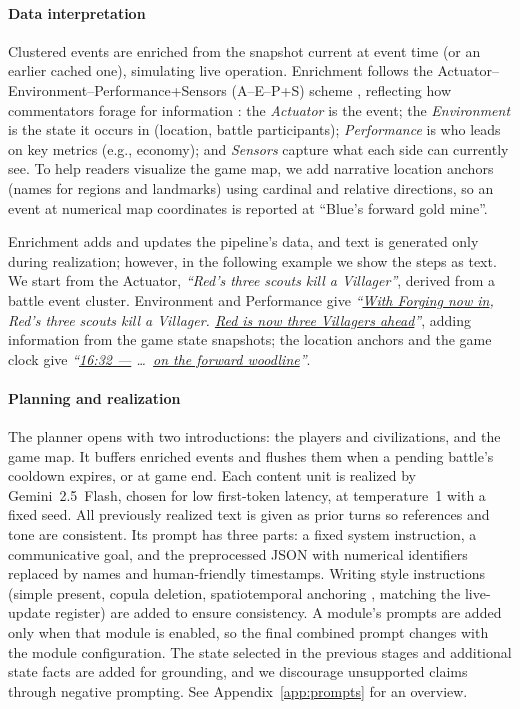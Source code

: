 \documentclass[11pt]{article}
\begin{document}
\paragraph{Data interpretation}
Clustered events are enriched from the snapshot current at event time (or an earlier cached one), simulating live operation. Enrichment follows the Actuator--Environment--Performance+Sensors (A--E--P+S) scheme \citep{russell1995, dodge2018}, reflecting how commentators forage for information \citep{dodge2018,penney2021,VanWingerden2026}: the \emph{Actuator} is the event; the \emph{Environment} is the state it occurs in (location, battle participants); \emph{Performance} is who leads on key metrics (e.g., economy); and \emph{Sensors} capture what each side can currently see. To help readers visualize the game map, we add narrative location anchors (names for regions and landmarks) using cardinal and relative directions, so an event at numerical map coordinates is reported at ``Blue's forward gold mine''.

Enrichment adds and updates the pipeline's data, and text is generated only during realization; however, in the following example we show the steps as text. We start from the Actuator, \emph{``Red's three scouts kill a Villager''}, derived from a battle event cluster. Environment and Performance give \emph{``\uline{With Forging now in}, Red's three scouts kill a Villager. \uline{Red is now three Villagers ahead}''}, adding information from the game state snapshots; the location anchors and the game clock give \emph{``\uline{16:32 ---} \ldots\ \uline{on the forward woodline}''}.

\paragraph{Planning and realization}
The planner opens with two introductions: the players and civilizations, and the game map. It buffers enriched events and flushes them when a pending battle's cooldown expires, or at game end. Each content unit is realized by Gemini~2.5~Flash, chosen for low first-token latency, at temperature~1 with a fixed seed. All previously realized text is given as prior turns so references and tone are consistent. Its prompt has three parts: a fixed system instruction, a communicative goal, and the preprocessed JSON with numerical identifiers replaced by names and human-friendly timestamps. Writing style instructions (simple present, copula deletion, spatiotemporal anchoring \citep{lewandowski2012}, matching the live-update register) are added to ensure consistency. A module's prompts are added only when that module is enabled, so the final combined prompt changes with the module configuration.
The state selected in the previous stages and additional state facts are added for grounding, and we discourage unsupported claims through negative prompting. See Appendix~\ref{app:prompts} for an overview.
\end{document}

